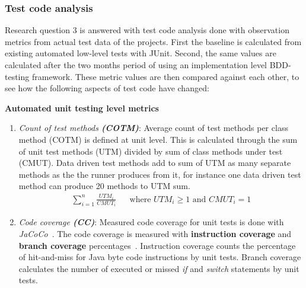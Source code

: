     \subsubsection{Test code analysis}
    \label{subsub:test}
    Research question 3 is answered with test code analysis done with observation metrics from actual test data of the projects.
    First the baseline is calculated from existing automated low-level tests with JUnit. Second, the same values are calculated
    after the two months period of using an implementation level BDD-testing framework. These metric values are then compared
    against each other, to see how the following aspects of test code have changed:
    \clearpage
    \begin{addmargin}[0em]{0em}
    \vspace{10px}
    \textbf{Automated unit testing level metrics}
    \vspace{5px}
    \newline
    \begin{enumerate}
    \item \textit{Count of test methods \textbf{(COTM)}}:
    Average count of test methods per class method (COTM) is defined at unit level. This is calculated through the sum
    of unit test methods (UTM) divided by sum of class methods under test (CMUT). Data driven test methods add to sum of UTM as
    many separate methods as the the runner produces from it, for instance one data driven test method can produce 20 methods to UTM sum.
    \begin{align*}
        \sum_{i=1}^{n}\frac{UTM_{i}}{CMUT_{i}} && \text {where } UTM_{i} \geq 1 \text{ and } CMUT_{i} = 1
    \end{align*}
    \item \textit{Code coverage \textbf{(CC)}}:
    Measured code coverage for unit tests is done with \textit{JaCoCo}~\cite{jacoco}. The code coverage is measured with
    \textbf{instruction coverage} and \textbf{branch coverage} percentages~\cite{jacoco-coverage}. Instruction coverage counts the percentage
    of hit-and-miss for Java byte code instructions by unit tests. Branch coverage calculates the number of executed or missed \textit{if}
    and \textit{switch} statements by unit tests.
    \end{enumerate}
    \end{addmargin}

